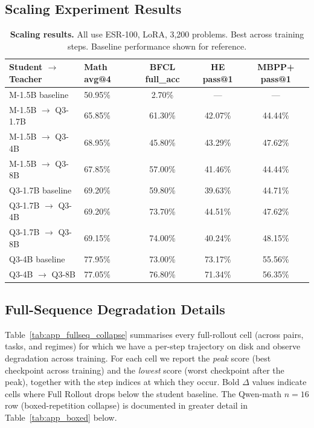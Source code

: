 \documentclass{article}
\begin{document}
\subsection{Scaling Experiment Results}

\begin{table}[!htbp]
\centering
\caption{\textbf{Scaling results.} All use ESR-100, LoRA, 3,200 problems. Best across training steps. Baseline performance shown for reference.}
\label{tab:app_scaling}
\small
\begin{tabular}{llccc}
\toprule
\textbf{Student $\rightarrow$ Teacher} & \textbf{Math avg@4} & \textbf{BFCL full\_acc} & \textbf{HE pass@1} & \textbf{MBPP+ pass@1} \\
\midrule
M-1.5B baseline & 50.95\% & 2.70\% & --- & --- \\
M-1.5B $\rightarrow$ Q3-1.7B & 65.85\% & 61.30\% & 42.07\% & 44.44\% \\
M-1.5B $\rightarrow$ Q3-4B & 68.95\% & 45.80\% & 43.29\% & 47.62\% \\
M-1.5B $\rightarrow$ Q3-8B & 67.85\% & 57.00\% & 41.46\% & 44.44\% \\
\midrule
Q3-1.7B baseline & 69.20\% & 59.80\% & 39.63\% & 44.71\% \\
Q3-1.7B $\rightarrow$ Q3-4B & 69.20\% & 73.70\% & 44.51\% & 47.62\% \\
Q3-1.7B $\rightarrow$ Q3-8B & 69.15\% & 74.00\% & 40.24\% & 48.15\% \\
\midrule
Q3-4B baseline & 77.95\% & 73.00\% & 73.17\% & 55.56\% \\
Q3-4B $\rightarrow$ Q3-8B & 77.05\% & 76.80\% & 71.34\% & 56.35\% \\
\bottomrule
\end{tabular}
\end{table}


\subsection{Full-Sequence Degradation Details}
\label{app:fullseq_degradation}

Table~\ref{tab:app_fullseq_collapse} summarises every full-rollout cell (across pairs, tasks, and regimes) for which we have a per-step trajectory on disk and observe degradation across training. For each cell we report the \emph{peak} score (best checkpoint across training) and the \emph{lowest} score (worst checkpoint after the peak), together with the step indices at which they occur. Bold $\Delta$ values indicate cells where Full Rollout drops below the student baseline. The Qwen-math \mbox{$n{=}16$} row (boxed-repetition collapse) is documented in greater detail in Table~\ref{tab:app_boxed} below.
\end{document}

